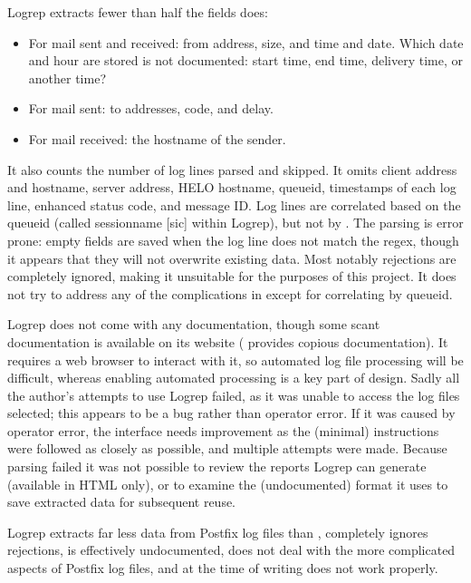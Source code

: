 Logrep extracts fewer than half the fields \parsername{} does:

\begin{itemize}

    \item For mail sent and received: from address, size, and time and
        date.  Which date and hour are stored is not documented: start
        time, end time, delivery time, or another time?

    \item For mail sent: to addresses,  code, and delay.

    \item For mail received: the hostname of the sender.

\end{itemize}

It also counts the number of log lines parsed and skipped.  It omits client
 address and hostname, server  address, HELO
hostname, queueid, timestamps of each log line, enhanced status code, and
message ID\@.  Log lines are correlated based on the queueid (called
sessionname [sic] within Logrep), but not by .  The parsing is
error prone: empty fields are saved when the log line does not match the
regex, though it appears that they will not overwrite existing data.  Most
notably rejections are completely ignored, making it unsuitable for the
purposes of this project.  It does not try to address any of the
complications in  except for correlating by
queueid.

Logrep does not come with any documentation, though some scant
documentation is available on its website (\parsername{} provides copious
documentation).  It requires a web browser to interact with it, so
automated log file processing will be difficult, whereas enabling automated
processing is a key part of \parsernames{} design.  Sadly all the author's
attempts to use Logrep failed, as it was unable to access the log files
selected; this appears to be a bug rather than operator error.  If it was
caused by operator error, the interface needs improvement as the (minimal)
instructions were followed as closely as possible, and multiple attempts
were made.  Because parsing failed it was not possible to review the
reports Logrep can generate (available in HTML only), or to examine the
(undocumented) format it uses to save extracted data for subsequent reuse.

Logrep extracts far less data from Postfix log files than \parsername{},
completely ignores rejections, is effectively undocumented, does not deal
with the more complicated aspects of Postfix log files, and at the time of
writing does not work properly.

